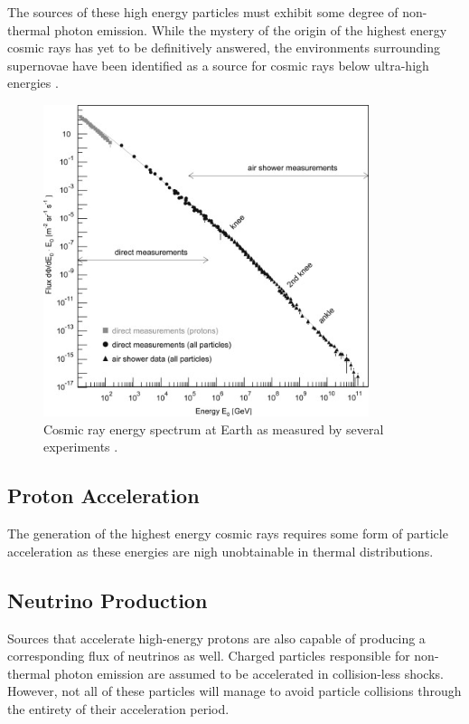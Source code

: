 \documentclass{gatech-thesis}
\begin{document}
The sources of these high energy particles must exhibit some degree of non-thermal photon emission. While the mystery of the origin of the highest energy cosmic rays has yet to be definitively answered, the environments surrounding supernovae have been identified as a source for cosmic rays below ultra-high energies \cite{Ackermann15022013}.

\begin{figure}[ht]
  \begin{center}
    \includegraphics[width=0.85\textwidth,keepaspectratio]{CosmicRaySpectrum.jpg}
  \end{center}
  \caption{Cosmic ray energy spectrum at Earth as measured by several experiments \cite{2009PrPNP..63..293B}.}
  \label{fig:cosmicray_spec}
\end{figure}

\subsection{Proton Acceleration}
The generation of the highest energy cosmic rays requires some form of particle acceleration as these energies are nigh unobtainable in thermal distributions. 

\subsection{Neutrino Production}
Sources that accelerate high-energy protons are also capable of producing a corresponding flux of neutrinos as well. Charged particles responsible for non-thermal photon emission are assumed to be accelerated in collision-less shocks. However, not all of these particles will manage to avoid particle collisions through the entirety of their acceleration period.
\end{document}
